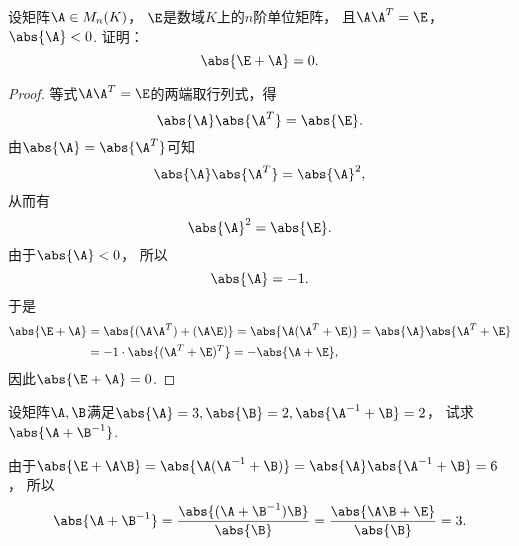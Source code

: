 \begin{example}\label{example:正交矩阵.行列式小于零的正交矩阵与单位矩阵之和的行列式等于零}
设矩阵\(\A \in M_n(K)\)，
\(\E\)是数域\(K\)上的\(n\)阶单位矩阵，
且\(\A \A^T = \E\)，\(\abs{\A}<0\).
证明：\[
	\abs{\E+\A}=0.
\]
\begin{proof}
等式\(\A \A^T=\E\)的两端取行列式，得\[
	\abs{\A} \abs{\A^T}
	= \abs{\E}.
\]
由\(\abs{\A} = \abs{\A^T}\)可知\[
	\abs{\A} \abs{\A^T}
	= \abs{\A}^2,
\]
从而有\[
	\abs{\A}^2 = \abs{\E}.
\]
由于\(\abs{\A} < 0\)，
所以\[
	\abs{\A} = -1.
\]
于是\begin{align*}
	\abs{\E+\A}
	&= \abs{(\A \A^T)+(\A \E)}
	= \abs{\A(\A^T+\E)}
	= \abs{\A} \abs{\A^T+\E} \\
	&= -1 \cdot \abs{(\A^T+\E)^T}
	= -\abs{\A+\E},
\end{align*}
因此\(\abs{\E+\A}=0\).
\end{proof}
\end{example}

\begin{example}
设矩阵\(\A,\B\)满足\(\abs{\A}=3,\abs{\B}=2,\abs{\A^{-1}+\B}=2\)，
试求\(\abs{\A+\B^{-1}}\).
\begin{solution}
由于\(\abs{\E+\A\B} = \abs{\A(\A^{-1}+\B)} = \abs{\A} \abs{\A^{-1}+\B} = 6\)，
所以\[
	\abs{\A+\B^{-1}}
	= \frac{\abs{(\A+\B^{-1})\B}}{\abs{\B}}
	= \frac{\abs{\A\B+\E}}{\abs{\B}}
	= 3.
\]
\end{solution}
\end{example}

